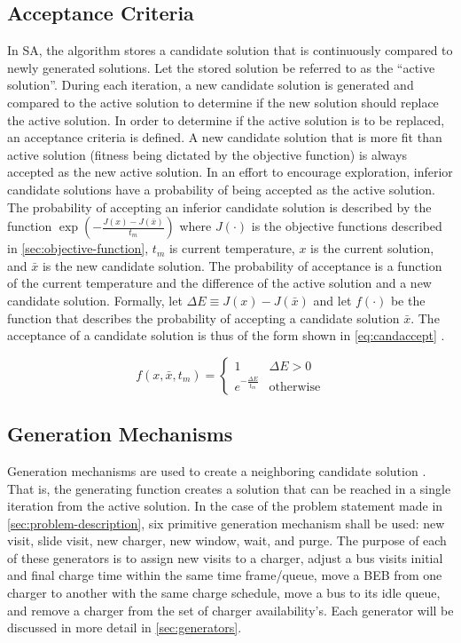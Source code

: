 \documentclass[11pt,a4paper,final]{article}
\begin{document}
\subsection{Acceptance Criteria}
\label{sec:acceptance}
In SA, the algorithm stores a candidate solution that is continuously compared to newly generated solutions. Let the
stored solution be referred to as the ``active solution''. During each iteration, a new candidate solution is generated
and compared to the active solution to determine if the new solution should replace the active solution. In order to
determine if the active solution is to be replaced, an acceptance criteria is defined. A new candidate solution that is
more fit than active solution (fitness being dictated by the objective function) is always accepted as the new active
solution. In an effort to encourage exploration, inferior candidate solutions have a probability of being accepted as
the active solution. The probability of accepting an inferior candidate solution is described by the function
\(\exp(-\frac{J(x) - J(\bar{x})}{t_m})\) where \(J(\cdot)\) is the objective functions described in \ref{sec:objective-function},
\(t_m\) is current temperature, \(x\) is the current solution, and \(\bar{x}\) is the new candidate solution. The probability
of acceptance is a function of the current temperature and the difference of the active solution and a new candidate
solution. Formally, let \(\Delta E \equiv J(x) - J(\bar{x})\) and let \(f(\cdot)\) be the function that describes the probability of
accepting a candidate solution \(\bar{x}\). The acceptance of a candidate solution is thus of the form shown in
\ref{eq:candaccept} \cite{keller-2019-multi-objec}.

\begin{equation}
\label{eq:candaccept}
f(x,\bar{x},t_m) =
\begin{cases}
  1                   & \Delta E > 0 \\
  e^{- \frac{\Delta E}{t_m}} & \text{otherwise}
\end{cases}
\end{equation}

\subsection{Generation Mechanisms}
\label{sec:generation-mechanisms}
Generation mechanisms are used to create a neighboring candidate solution \cite{gendreau-2018-handb-metah}. That is,
the generating function creates a solution that can be reached in a single iteration from the active solution. In the
case of the problem statement made in \ref{sec:problem-description}, six primitive generation mechanism shall be used: new
visit, slide visit, new charger, new window, wait, and purge. The purpose of each of these generators is to assign new
visits to a charger, adjust a bus visits initial and final charge time within the same time frame/queue, move a BEB from
one charger to another with the same charge schedule, move a bus to its idle queue, and remove a charger from the set
of charger availability's. Each generator will be discussed in more detail in \ref{sec:generators}.
\end{document}
